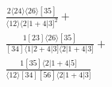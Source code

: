 \documentclass[varwidth, border=5pt]{standalone}
\begin{document}
\begin{my}
$\begin{gathered}
\scriptscriptstyle\frac{2⟨24⟩⟨26⟩[35]}{⟨12⟩⟨2|1+4|3]^2}+\\
\scriptscriptstyle\frac{1[23]⟨26⟩[35]}{[34]⟨1|2+4|3]⟨2|1+4|3]}+\\
\scriptscriptstyle\frac{1[35]⟨2|1+4|5]}{⟨12⟩[34][56]⟨2|1+4|3]}\phantom{+}
\end{gathered}$
\end{my}
\end{document}
